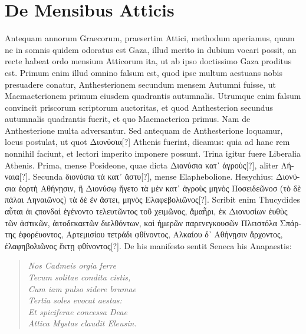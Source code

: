 \section{De Mensibus Atticis}
Antequam annorum Graecorum, praesertim Attici, methodum
aperiamus, quam ne in somnis quidem odoratus est Gaza,
illud merito in dubium vocari possit, an recte habeat ordo mensium
Atticorum ita, ut ab ipso doctissimo Gaza proditus est.
%
Primum enim
illud omnino falsum est, quod ipse multum aestuans nobis presuadere
conatur, Anthesterionem secundum mensem Autumni fuisse, ut Maemacterionem
primum eiusdem quadrantis autumnalis.
Utrumque
enim falsum convincit priscorum scriptorum auctoritas, et quod Anthesterion
secundus autumnalis quadrantis fuerit, et quo Maemacterion
primus.
Nam de Anthesterione multa adversantur.
Sed antequam de Anthesterione loquamur, locus postulat, ut quot
 \textgreek{Διονύσια[?]}
Athenis fuerint, dicamus: quia ad hanc rem nonnihil faciunt, et lectori
imperito imponere possunt.
Trina igitur fuere Liberalia Athenis.
Prima, mense Posideone, quae dicta \textgreek{Διανύσια κατ᾽ ἀγροὺς[?]},
 aliter \textgreek{Λήναια[?]}.
Secunda \textgreek{διονύσια τὰ κατ᾽ ἄστυ[?]}, mense Elaphebolione.
Hesychius: \textgreek{Διονύσια
ἑορτὴ Αθήνῃσιν, ἣ Διονύσῳ ἤγετο τὰ μὲν κατ᾽ ἀγροὺς μηνὸς Ποσειδεῶνοσ (τὸ
δὲ πάλαι Ληναιῶνος) τὰ δὲ ἐν ἄστει, μηνὸς Ελαφεβολιῶνος[?]}.
Scribit enim
Thucydides \textgreek{αὗται ἁι ςπονδαὶ ἐγένοντο τελευτῶντος τοῦ χειμῶνος,
 ἄμαἦρι, ἐκ
Διονυσίων ἐυθὺς τῶν ἀστικῶν, ἀιτοδεκαετῶν διελθόντων,
 καὶ ἡμερῶν παρενεγκουσῶν
Πλειστόλα Σπάρτης ἐφορέυοντος, Αρτεμισίου τετράδι φθίνοντος, Αλκαίου
δ᾽ Αθήνῃσιν ἄρχοντος, ἐλαφηβολιῶνος ἕκτῃ φθίνοντος[?]}.
De his manifesto sentit Seneca his Anapaestis:
\begin{verse}
  \textit{Nos Cadmeis orgia ferre\\
  Tecum solitae condita cistis,\\
  Cum iam pulso sidere brumae\\
  Tertia soles evocat aestas:\\
  Et spiciferae concessa Deae\\
  Attica Mystas claudit Eleusin.}
\end{verse}
